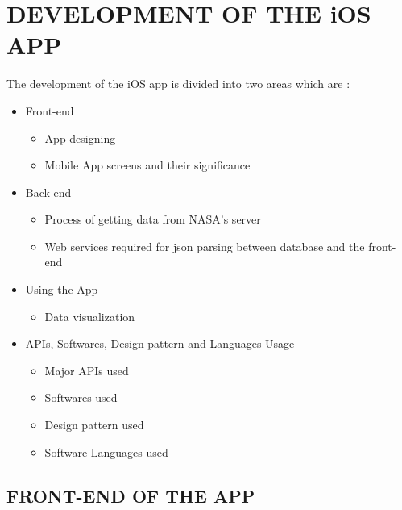\chapter{DEVELOPMENT OF THE iOS APP}
\label{chap:development of the app}

The development of the iOS app is divided into two areas which are :

\begin{itemize}
    \item Front-end
        \begin{itemize}
            \item App designing
            \item Mobile App screens and their significance \\
        \end{itemize}

    \item Back-end
        \begin{itemize}
            \item Process of getting data from NASA's server
            \item Web services required for \gls{json} parsing between database and the front-end \\
        \end{itemize}
        
    \item Using the App
        \begin{itemize}
            \item Data visualization
        \end{itemize}
    
     \item APIs, Softwares, Design pattern and Languages Usage
        \begin{itemize}
            \item Major APIs used
            \item Softwares used
            \item Design pattern used
            \item Software Languages used \\
        \end{itemize}    
\end{itemize}

\section{FRONT-END OF THE APP}

